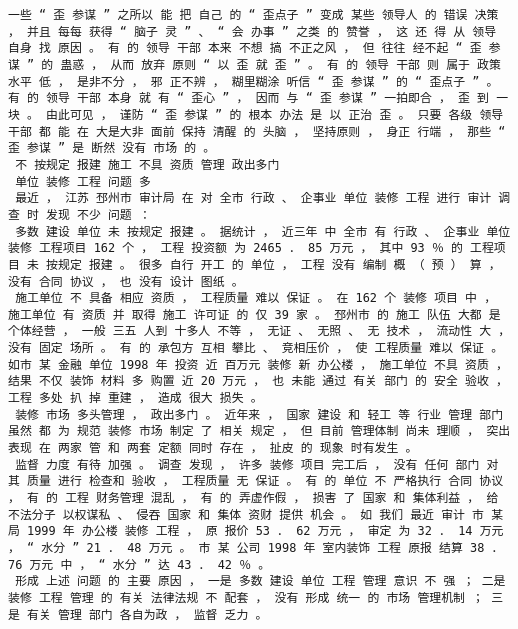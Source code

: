 \documentclass{article}
\begin{document}
\begin{Verbatim}[commandchars=\\\{\}]
 一些 “ 歪 参谋 ” 之所以 能 把 自己 的 “ 歪点子 ” 变成 某些 领导人 的 错误 决策 ， 并且 每每 获得 “ 脑子 灵 ” 、 “ 会 办事 ” 之类 的 赞誉 ， 这 还 得 从 领导 自身 找 原因 。 有 的 领导 干部 本来 不想 搞 不正之风 ， 但 往往 经不起 “ 歪 参谋 ” 的 蛊惑 ， 从而 放弃 原则 “ 以 歪 就 歪 ” 。 有 的 领导 干部 则 属于 政策 水平 低 ， 是非不分 ， 邪 正不辨 ， 糊里糊涂 听信 “ 歪 参谋 ” 的 “ 歪点子 ” 。 有 的 领导 干部 本身 就 有 “ 歪心 ” ， 因而 与 “ 歪 参谋 ” 一拍即合 ， 歪 到 一块 。 由此可见 ， 谨防 “ 歪 参谋 ” 的 根本 办法 是 以 正治 歪 。 只要 各级 领导 干部 都 能 在 大是大非 面前 保持 清醒 的 头脑 ， 坚持原则 ， 身正 行端 ， 那些 “ 歪 参谋 ” 是 断然 没有 市场 的 。 
 不 按规定 报建 施工 不具 资质 管理 政出多门 
 单位 装修 工程 问题 多 
 最近 ， 江苏 邳州市 审计局 在 对 全市 行政 、 企事业 单位 装修 工程 进行 审计 调查 时 发现 不少 问题 ： 
 多数 建设 单位 未 按规定 报建 。 据统计 ， 近三年 中 全市 有 行政 、 企事业 单位 装修 工程项目 162 个 ， 工程 投资额 为 2465 ． 85 万元 ， 其中 93 ％ 的 工程项目 未 按规定 报建 。 很多 自行 开工 的 单位 ， 工程 没有 编制 概 （ 预 ） 算 ， 没有 合同 协议 ， 也 没有 设计 图纸 。 
 施工单位 不 具备 相应 资质 ， 工程质量 难以 保证 。 在 162 个 装修 项目 中 ， 施工单位 有 资质 并 取得 施工 许可证 的 仅 39 家 。 邳州市 的 施工 队伍 大都 是 个体经营 ， 一般 三五 人到 十多人 不等 ， 无证 、 无照 、 无 技术 ， 流动性 大 ， 没有 固定 场所 。 有 的 承包方 互相 攀比 、 竞相压价 ， 使 工程质量 难以 保证 。 如市 某 金融 单位 1998 年 投资 近 百万元 装修 新 办公楼 ， 施工单位 不具 资质 ， 结果 不仅 装饰 材料 多 购置 近 20 万元 ， 也 未能 通过 有关 部门 的 安全 验收 ， 工程 多处 扒 掉 重建 ， 造成 很大 损失 。 
 装修 市场 多头管理 ， 政出多门 。 近年来 ， 国家 建设 和 轻工 等 行业 管理 部门 虽然 都 为 规范 装修 市场 制定 了 相关 规定 ， 但 目前 管理体制 尚未 理顺 ， 突出表现 在 两家 管 和 两套 定额 同时 存在 ， 扯皮 的 现象 时有发生 。 
 监督 力度 有待 加强 。 调查 发现 ， 许多 装修 项目 完工后 ， 没有 任何 部门 对 其 质量 进行 检查和 验收 ， 工程质量 无 保证 。 有 的 单位 不 严格执行 合同 协议 ， 有 的 工程 财务管理 混乱 ， 有 的 弄虚作假 ， 损害 了 国家 和 集体利益 ， 给 不法分子 以权谋私 、 侵吞 国家 和 集体 资财 提供 机会 。 如 我们 最近 审计 市 某局 1999 年 办公楼 装修 工程 ， 原 报价 53 ． 62 万元 ， 审定 为 32 ． 14 万元 ， “ 水分 ” 21 ． 48 万元 。 市 某 公司 1998 年 室内装饰 工程 原报 结算 38 ． 76 万元 中 ， “ 水分 ” 达 43 ． 42 ％ 。 
 形成 上述 问题 的 主要 原因 ， 一是 多数 建设 单位 工程 管理 意识 不 强 ； 二是 装修 工程 管理 的 有关 法律法规 不 配套 ， 没有 形成 统一 的 市场 管理机制 ； 三是 有关 管理 部门 各自为政 ， 监督 乏力 。 

\end{Verbatim}
\end{document}
